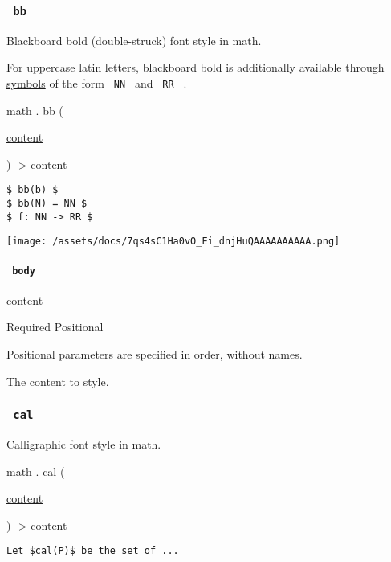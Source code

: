 \subsubsection{\texorpdfstring{\texttt{\ bb\ }}{ bb }}\label{functions-bb}

Blackboard bold (double-struck) font style in math.

For uppercase latin letters, blackboard bold is additionally available
through \href{/docs/reference/symbols/sym/}{symbols} of the form
\texttt{\ NN\ } and \texttt{\ RR\ } .

math { . } { bb } (

{ \href{/docs/reference/foundations/content/}{content} }

) -\textgreater{} \href{/docs/reference/foundations/content/}{content}

\begin{verbatim}
$ bb(b) $
$ bb(N) = NN $
$ f: NN -> RR $
\end{verbatim}

\texttt{[image: /assets/docs/7qs4sC1Ha0vO\_Ei\_dnjHuQAAAAAAAAAA.png]}

\paragraph{\texorpdfstring{\texttt{\ body\ }}{ body }}\label{functions-bb-body}

\href{/docs/reference/foundations/content/}{content}

{Required} {{ Positional }}

\label{functions-bb-body-positional-tooltip}
Positional parameters are specified in order, without names.

The content to style.

\subsubsection{\texorpdfstring{\texttt{\ cal\ }}{ cal }}\label{functions-cal}

Calligraphic font style in math.

math { . } { cal } (

{ \href{/docs/reference/foundations/content/}{content} }

) -\textgreater{} \href{/docs/reference/foundations/content/}{content}

\begin{verbatim}
Let $cal(P)$ be the set of ...
\end{verbatim}

